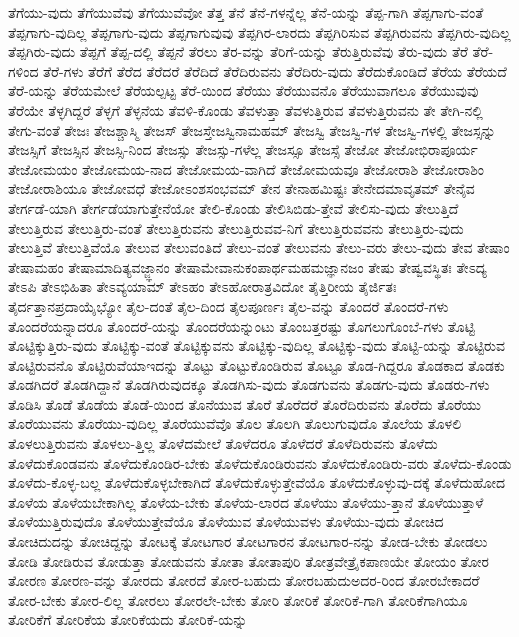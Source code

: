 {ತೆಗೆಯು-ವುದು
ತೆಗೆಯುವೆವು
ತೆಗೆಯುವೆವೋ
ತೆತ್ತ
ತೆನೆ
ತೆನೆ-ಗಳನ್ನೆಲ್ಲ
ತೆನೆ-ಯನ್ನು
ತೆಪ್ಪ-ಗಾಗಿ
ತೆಪ್ಪಗಾಗು-ವಂತೆ
ತೆಪ್ಪಗಾಗು-ವುದಿಲ್ಲ
ತೆಪ್ಪಗಾಗು-ವುದು
ತೆಪ್ಪಗಾಗುವುವು
ತೆಪ್ಪಗಿರ-ಲಾರದು
ತೆಪ್ಪಗಿರಿಸುವ
ತೆಪ್ಪಗಿರುವನು
ತೆಪ್ಪಗಿರು-ವುದಿಲ್ಲ
ತೆಪ್ಪಗಿರು-ವುದು
ತೆಪ್ಪಗೆ
ತೆಪ್ಪ-ದಲ್ಲಿ
ತೆಪ್ಪನೆ
ತೆರಲು
ತೆರ-ವನ್ನು
ತೆರಿಗೆ-ಯನ್ನು
ತೆರುತ್ತಿರುವೆವು
ತೆರು-ವುದು
ತೆರೆ
ತೆರೆ-ಗಳಿಂದ
ತೆರೆ-ಗಳು
ತೆರೆಗೆ
ತೆರೆದ
ತೆರೆದರೆ
ತೆರೆದಿದೆ
ತೆರೆದಿರುವನು
ತೆರೆದಿರು-ವುದು
ತೆರೆದುಕೊಂಡಿದೆ
ತೆರೆಯ
ತೆರೆಯದೆ
ತೆರೆ-ಯನ್ನು
ತೆರೆಯಮೇಲೆ
ತೆರೆಯಲ್ಪಟ್ಟ
ತೆರೆ-ಯಿಂದ
ತೆರೆಯು
ತೆರೆಯುವನೊ
ತೆರೆಯುವಾಗಲೂ
ತೆರೆಯುವುವು
ತೆರೆಯೇ
ತೆಳ್ಳಗಿದ್ದರೆ
ತೆಳ್ಳಗೆ
ತೆಳ್ಳನೆಯ
ತೆವಳಿ-ಕೊಂಡು
ತೆವಳುತ್ತಾ
ತೆವಳುತ್ತಿರುವ
ತೆವಳುತ್ತಿರುವನು
ತೇ
ತೇಗಿ-ನಲ್ಲಿ
ತೇಗು-ವಂತೆ
ತೇಜಃ
ತೇಜಶ್ಚಾಸ್ಮಿ
ತೇಜಸ್
ತೇಜಸ್ತೇಜಸ್ವಿನಾಮಹಮ್
ತೇಜಸ್ವಿ
ತೇಜಸ್ವಿ-ಗಳ
ತೇಜಸ್ವಿ-ಗಳಲ್ಲಿ
ತೇಜಸ್ಸನ್ನು
ತೇಜಸ್ಸಿಗೆ
ತೇಜಸ್ಸಿನ
ತೇಜಸ್ಸಿ-ನಿಂದ
ತೇಜಸ್ಸು
ತೇಜಸ್ಸು-ಗಳೆಲ್ಲ
ತೇಜಸ್ಸೂ
ತೇಜಸ್ಸೆ
ತೇಜೋ
ತೇಜೋಭಿರಾಪೂರ್ಯ
ತೇಜೋಮಯಂ
ತೇಜೋಮಯ-ನಾದ
ತೇಜೋಮಯ-ವಾಗಿದೆ
ತೇಜೋಮಯವೂ
ತೇಜೋರಾಶಿ
ತೇಜೋರಾಶಿಂ
ತೇಜೋರಾಶಿಯೂ
ತೇಜೋವಧೆ
ತೇಜೋಽಂಶಸಂಭವಮ್
ತೇನ
ತೇನಾಹಮಿಷ್ಟಃ
ತೇನೇದಮಾವೃತಮ್
ತೇನೈವ
ತೇರ್ಗಡೆ-ಯಾಗಿ
ತೇರ್ಗಡೆಯಾಗುತ್ತೇನೆಯೋ
ತೇಲಿ-ಕೊಂಡು
ತೇಲಿಸಿಬಿಡು-ತ್ತೇವೆ
ತೇಲಿಸು-ವುದು
ತೇಲುತ್ತಿದೆ
ತೇಲುತ್ತಿರುವ
ತೇಲುತ್ತಿರು-ವಂತೆ
ತೇಲುತ್ತಿರುವನು
ತೇಲುತ್ತಿರುವವ-ನಿಗೆ
ತೇಲುತ್ತಿರುವವನು
ತೇಲುತ್ತಿರು-ವುದು
ತೇಲುತ್ತಿವೆ
ತೇಲುತ್ತಿವೆಯೊ
ತೇಲುವ
ತೇಲುವಂತಿದೆ
ತೇಲು-ವಂತೆ
ತೇಲುವನು
ತೇಲು-ವರು
ತೇಲು-ವುದು
ತೇವ
ತೇಷಾಂ
ತೇಷಾಮಹಂ
ತೇಷಾಮಾದಿತ್ಯವಜ್ಜ್ಞಾನಂ
ತೇಷಾಮೇವಾನುಕಂಪಾರ್ಥಮಹಮಜ್ಞಾನಜಂ
ತೇಷು
ತೇಷ್ವವಸ್ಥಿತಃ
ತೇಽದ್ಯ
ತೇಽಪಿ
ತೇಽಭಿಹಿತಾ
ತೇಽವ್ಯಯಾಮ್
ತೇಽಹಂ
ತೇಽಹೋರಾತ್ರವಿದೋ
ತೈತ್ತಿರೀಯ
ತೈರ್ಜಿತಃ
ತೈರ್ದತ್ತಾನಪ್ರದಾಯೈಭ್ಯೋ
ತೈಲ-ದಂತೆ
ತೈಲ-ದಿಂದ
ತೈಲಪೂರ್ಣಃ
ತೈಲ-ವನ್ನು
ತೊಂದರೆ
ತೊಂದರೆ-ಗಳು
ತೊಂದರೆಯನ್ನಾದರೂ
ತೊಂದರೆ-ಯನ್ನು
ತೊಂದರೆಯನ್ನುಂಟು
ತೊಂಬತ್ತರಷ್ಟು
ತೊಗಲುಗೊಂಬೆ-ಗಳು
ತೊಟ್ಟಿ
ತೊಟ್ಟಿಕ್ಕುತ್ತಿರು-ವುದು
ತೊಟ್ಟಿಕ್ಕು-ವಂತೆ
ತೊಟ್ಟಿಕ್ಕುವನು
ತೊಟ್ಟಿಕ್ಕು-ವುದಿಲ್ಲ
ತೊಟ್ಟಿಕ್ಕು-ವುದು
ತೊಟ್ಟಿ-ಯನ್ನು
ತೊಟ್ಟಿರುವ
ತೊಟ್ಟಿರುವನೊ
ತೊಟ್ಟಿರುವೆಯಾಇದನ್ನು
ತೊಟ್ಟು
ತೊಟ್ಟುಕೊಂಡಿರುವ
ತೊಟ್ಟೂ
ತೊಡ-ಗಿದ್ದರೂ
ತೊಡಕಾದ
ತೊಡಕು
ತೊಡಗಿದರೆ
ತೊಡಗಿದ್ದಾನೆ
ತೊಡಗಿರುವುದಕ್ಕೂ
ತೊಡಗಿಸು-ವುದು
ತೊಡಗುವನು
ತೊಡಗು-ವುದು
ತೊಡರು-ಗಳು
ತೊಡಿಸಿ
ತೊಡೆ
ತೊಡೆಯ
ತೊಡೆ-ಯಿಂದ
ತೊನೆಯುವ
ತೊರೆ
ತೊರೆದರೆ
ತೊರೆದಿರುವನು
ತೊರೆದು
ತೊರೆಯು
ತೊರೆಯುವನು
ತೊರೆಯು-ವುದಿಲ್ಲ
ತೊರೆಯುವೆವೊ
ತೊಲ
ತೊಲಗಿ
ತೊಲುಗುವುದೊ
ತೊಲೆಯ
ತೊಳಲಿ
ತೊಳಲುತ್ತಿರುವನು
ತೊಳಲು-ತ್ತಿಲ್ಲ
ತೊಳೆದಮೇಲೆ
ತೊಳೆದರೂ
ತೊಳೆದರೆ
ತೊಳೆದಿರುವನು
ತೊಳೆದು
ತೊಳೆದುಕೊಂಡವನು
ತೊಳೆದುಕೊಂಡಿರ-ಬೇಕು
ತೊಳೆದುಕೊಂಡಿರುವನು
ತೊಳೆದುಕೊಂಡಿರು-ವರು
ತೊಳೆದು-ಕೊಂಡು
ತೊಳೆದು-ಕೊಳ್ಳ-ಬಲ್ಲ
ತೊಳೆದುಕೊಳ್ಳಬೇಕಾಗಿದೆ
ತೊಳೆದುಕೊಳ್ಳುತ್ತೇವೆಯೊ
ತೊಳೆದುಕೊಳ್ಳುವು-ದಕ್ಕೆ
ತೊಳೆದುಹೋದ
ತೊಳೆಯ
ತೊಳೆಯಬೇಕಾಗಿಲ್ಲ
ತೊಳೆಯ-ಬೇಕು
ತೊಳೆಯ-ಲಾರದ
ತೊಳೆಯು
ತೊಳೆಯು-ತ್ತಾನೆ
ತೊಳೆಯುತ್ತಾಳೆ
ತೊಳೆಯುತ್ತಿರುವುದೊ
ತೊಳೆಯುತ್ತೇವೆಯೊ
ತೊಳೆಯುವ
ತೊಳೆಯುವಳು
ತೊಳೆಯು-ವುದು
ತೋಚಿದ
ತೋಚಿದುದನ್ನು
ತೋಚಿದ್ದನ್ನು
ತೋಟಕ್ಕೆ
ತೋಟಗಾರ
ತೋಟಗಾರನ
ತೋಟಗಾರ-ನನ್ನು
ತೋಡ-ಬೇಕು
ತೋಡಲು
ತೋಡಿ
ತೋಡಿರುವ
ತೋಡುತ್ತಾ
ತೋಡುವನು
ತೋತಾ
ತೋತಾಪುರಿ
ತೋತ್ರವೇತ್ರೈಕಪಾಣಯೇ
ತೋಯಂ
ತೋರ
ತೋರಣ
ತೋರಣ-ವನ್ನು
ತೋರದು
ತೋರದೆ
ತೋರ-ಬಹುದು
ತೋರಬಹುದುಅದರ-ರಿಂದ
ತೋರಬೇಕಾದರೆ
ತೋರ-ಬೇಕು
ತೋರ-ಲಿಲ್ಲ
ತೋರಲು
ತೋರಲೇ-ಬೇಕು
ತೋರಿ
ತೋರಿಕೆ
ತೋರಿಕೆ-ಗಾಗಿ
ತೋರಿಕೆಗಾಗಿಯೂ
ತೋರಿಕೆಗೆ
ತೋರಿಕೆಯ
ತೋರಿಕೆಯದು
ತೋರಿಕೆ-ಯನ್ನು
}

